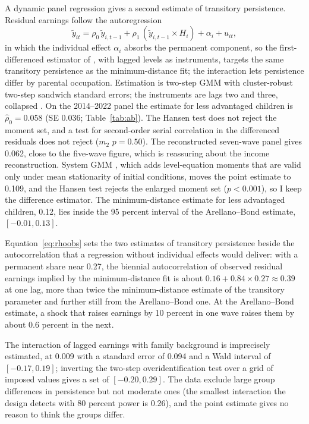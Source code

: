 \documentclass[11pt]{article}
\begin{document}
A dynamic panel regression gives a second estimate of transitory
persistence. Residual earnings follow the autoregression
\begin{equation}
\tilde y_{it} = \rho_0\, \tilde y_{i,t-1}
 + \rho_1\, (\tilde y_{i,t-1} \times H_i) + \alpha_i + u_{it},
\label{eq:ab}
\end{equation}
in which the individual effect $\alpha_i$ absorbs the permanent
component, so the first-differenced estimator of
\citet{ArellanoBond1991}, with lagged levels as instruments, targets
the same transitory persistence as the minimum-distance fit; the
interaction lets persistence differ by parental occupation. Estimation is two-step GMM with cluster-robust two-step sandwich standard errors; the instruments are lags two and three, collapsed \citep{Roodman2009}. On the 2014--2022 panel the estimate for less advantaged children is
$\hat\rho_0 = 0.058$ (SE 0.036; Table~\ref{tab:ab}). The Hansen test does not
reject the moment set, and a test for second-order
serial correlation in the differenced residuals does not reject ($m_2$ $p = 0.50$). The reconstructed seven-wave panel gives 0.062, close to the five-wave figure, which is reassuring
about the income reconstruction. System GMM \citep{BlundellBond1998}, which adds level-equation
moments that are valid only under mean stationarity of initial
conditions, moves the point estimate to 0.109, and the Hansen test rejects the enlarged moment set ($p < 0.001$), so I keep the difference estimator.
The minimum-distance estimate for less advantaged children, 0.12, lies inside the 95 percent interval of the Arellano--Bond estimate, $[-0.01, 0.13]$.

Equation~\eqref{eq:rhoobs} sets
the two estimates of transitory persistence beside the autocorrelation that a regression without individual effects would deliver: with a permanent share near 0.27, the biennial autocorrelation of observed residual earnings implied by the minimum-distance fit is about $0.16 + 0.84 \times 0.27 \approx 0.39$ at one lag, more than twice the
minimum-distance estimate of the transitory parameter and further still
from the Arellano--Bond one. At the Arellano--Bond estimate, a shock that raises earnings by 10
percent in one wave raises them by about 0.6 percent in the next.

The interaction of lagged earnings with family background is imprecisely estimated, at 0.009 with a standard error of 0.094 and a Wald interval of $[-0.17, 0.19]$; inverting the
two-step overidentification test over a grid of imposed values gives a
set of $[-0.20, 0.29]$. The data exclude
large group differences in persistence but not moderate ones (the
smallest interaction the design detects with 80 percent power is 0.26),
and the point estimate gives no reason to think the groups differ.
\end{document}
